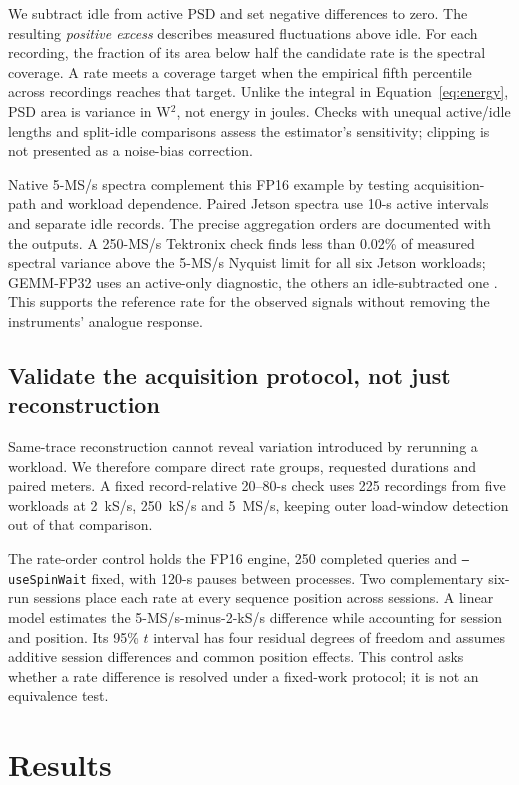 \documentclass[a4paper,UKenglish,cleveref,autoref]{oasics-v2021}
\begin{document}
We subtract idle from active PSD and set negative differences to zero. The resulting \emph{positive excess} describes measured fluctuations above idle. For each recording, the fraction of its area below half the candidate rate is the spectral coverage. A rate meets a coverage target when the empirical fifth percentile across recordings reaches that target. Unlike the integral in Equation~\ref{eq:energy}, PSD area is variance in W$^2$, not energy in joules. Checks with unequal active/idle lengths and split-idle comparisons assess the estimator's sensitivity; clipping is not presented as a noise-bias correction.

Native 5-MS/s spectra complement this FP16 example by testing acquisition-path and workload dependence. Paired Jetson spectra use 10-s active intervals and separate idle records. The precise aggregation orders are documented with the outputs. A 250-MS/s Tektronix check finds less than 0.02\% of measured spectral variance above the 5-MS/s Nyquist limit for all six Jetson workloads; GEMM-FP32 uses an active-only diagnostic, the others an idle-subtracted one \cite{energyResults2026}. This supports the reference rate for the observed signals without removing the instruments' analogue response.

\subsection{Validate the acquisition protocol, not just reconstruction}
\label{sec:control-method}
Same-trace reconstruction cannot reveal variation introduced by rerunning a workload. We therefore compare direct rate groups, requested durations and paired meters. A fixed record-relative 20--80-s check uses 225 recordings from five workloads at 2~kS/s, 250~kS/s and 5~MS/s, keeping outer load-window detection out of that comparison.

The rate-order control holds the FP16 engine, 250 completed queries and \texttt{--useSpinWait} fixed, with 120-s pauses between processes. Two complementary six-run sessions place each rate at every sequence position across sessions. A linear model estimates the 5-MS/s-minus-2-kS/s difference while accounting for session and position. Its 95\% $t$ interval has four residual degrees of freedom and assumes additive session differences and common position effects. This control asks whether a rate difference is resolved under a fixed-work protocol; it is not an equivalence test.

\section{Results}
\end{document}
